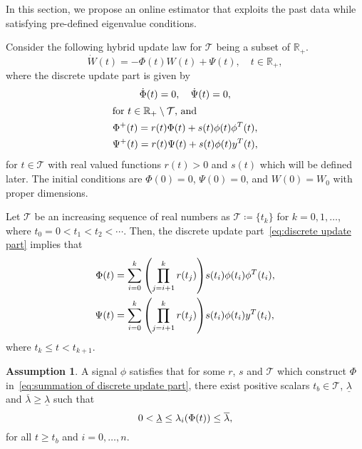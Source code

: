 \documentclass[]{IEEEtran}
\theoremstyle{definition}
\newtheorem{assumption}{Assumption}
\theoremstyle{remark}
\newcommand{\MB}[1]{\mathbb{#1}}
\newcommand{\MC}[1]{\mathcal{#1}}
\begin{document}
In this section, we propose an online estimator that exploits the past data
while satisfying pre-defined eigenvalue conditions. 

Consider the following hybrid update law for $\MC{T}$ being a subset of
$\MB{R}_{+}$.
\begin{equation}\label{eq:hybrid update law}
	\dot{W}(t) = - \Phi(t) W(t) + \Psi(t), \quad t \in \MB{R}_{+},
\end{equation}
where the discrete update part is given by
\begin{subequations}\label{eq:discrete update part}
	\begin{gather}
		\dot{\Phi}(t) = 0, \quad \dot{\Psi}(t) = 0, \\
		\intertext{for $t \in \MB{R}_{+} \setminus \MC{T}$, and}
		\Phi^{+} (t) = r(t) \Phi(t) + s(t) \phi(t) \phi^T(t), \\
		\Psi^{+} (t) = r(t) \Psi(t) + s(t) \phi(t) y^T(t),
	\end{gather}
\end{subequations}
for $t \in \MC{T}$ with real valued functions $r(t) > 0$ and $s(t)$ which will
be defined later. The initial conditions are $\Phi(0) = 0$, $\Psi(0) = 0$, and
$W(0) = W_0$ with proper dimensions.

Let $\MC{T}$ be an increasing sequence of real numbers as $\MC{T} \coloneqq
\{t_k\}$ for $k = 0, 1, \dotsc$, where $ t_0 = 0 < t_1 < t_2 < \cdots $.
Then, the discrete update part~\eqref{eq:discrete update part} implies that
\begin{subequations}\label{eq:summation of discrete update part}
	\begin{align}
		\Phi(t) &= \sum_{i=0}^{k} \qty(\prod_{j=i+1}^{k} r(t_j)) s(t_i) \phi(t_i)
		\phi^T(t_i), \\
		\Psi(t) &= \sum_{i=0}^{k} \qty(\prod_{j=i+1}^{k} r(t_j)) s(t_i) \phi(t_i)
		y^T(t_i),
	\end{align}
\end{subequations}
where $t_k \le t < t_{k+1}$.

\begin{assumption}\label{assumption:discrete bounded eigenvalues}
	A signal $\phi$ satisfies that for some $r$, $s$ and $\MC{T}$ which
	construct $\Phi$ in~\eqref{eq:summation of discrete update part}, there
	exist positive scalars $t_b \in \MC{T}$, $\underline{\lambda}$ and
	$\overline{\lambda} \ge \underline{\lambda}$ such that
	\begin{equation}
		0 < \underline{\lambda} \le \lambda_i\qty(\Phi(t)) \le \overline{\lambda},
	\end{equation}
	for all $t \ge t_b$ and $i = 0, \dotsc, n$.
\end{assumption}
\end{document}
